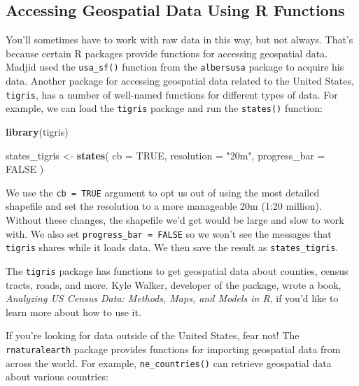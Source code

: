 \documentclass[
]{book}
\newenvironment{Shaded}{\begin{snugshade}}{\end{snugshade}}
\newcommand{\AttributeTok}[1]{\textcolor[rgb]{0.13,0.29,0.53}{#1}}
\newcommand{\ConstantTok}[1]{\textcolor[rgb]{0.56,0.35,0.01}{#1}}
\newcommand{\FunctionTok}[1]{\textcolor[rgb]{0.13,0.29,0.53}{\textbf{#1}}}
\newcommand{\NormalTok}[1]{#1}
\newcommand{\OtherTok}[1]{\textcolor[rgb]{0.56,0.35,0.01}{#1}}
\newcommand{\StringTok}[1]{\textcolor[rgb]{0.31,0.60,0.02}{#1}}
\begin{document}
\hypertarget{accessing-geospatial-data-using-r-functions}{%
\subsection*{Accessing Geospatial Data Using R Functions}\label{accessing-geospatial-data-using-r-functions}}

You'll sometimes have to work with raw data in this way, but not always. That's because certain R packages provide functions for accessing geospatial data. Madjid used the \texttt{usa\_sf()} function from the \texttt{albersusa} package to acquire his data. Another package for accessing geospatial data related to the United States, \texttt{tigris}, has a number of well-named functions for different types of data. For example, we can load the \texttt{tigris} package and run the \texttt{states()} function:

\begin{Shaded}
\begin{Highlighting}[]
\FunctionTok{library}\NormalTok{(tigris)}

\NormalTok{states\_tigris }\OtherTok{\textless{}{-}} \FunctionTok{states}\NormalTok{(}
  \AttributeTok{cb =} \ConstantTok{TRUE}\NormalTok{,}
  \AttributeTok{resolution =} \StringTok{"20m"}\NormalTok{,}
  \AttributeTok{progress\_bar =} \ConstantTok{FALSE}
\NormalTok{)}
\end{Highlighting}
\end{Shaded}

We use the \texttt{cb\ =\ TRUE} argument to opt us out of using the most detailed shapefile and set the resolution to a more manageable 20m (1:20 million). Without these changes, the shapefile we'd get would be large and slow to work with. We also set \texttt{progress\_bar\ =\ FALSE} so we won't see the messages that \texttt{tigris} shares while it loads data. We then save the result as \texttt{states\_tigris}.

The \texttt{tigris} package has functions to get geospatial data about counties, census tracts, roads, and more. Kyle Walker, developer of the package, wrote a book, \emph{Analyzing US Census Data: Methods, Maps, and Models in R}, if you'd like to learn more about how to use it.

If you're looking for data outside of the United States, fear not! The \texttt{rnaturalearth} package provides functions for importing geospatial data from across the world. For example, \texttt{ne\_countries()} can retrieve geospatial data about various countries:
\end{document}
